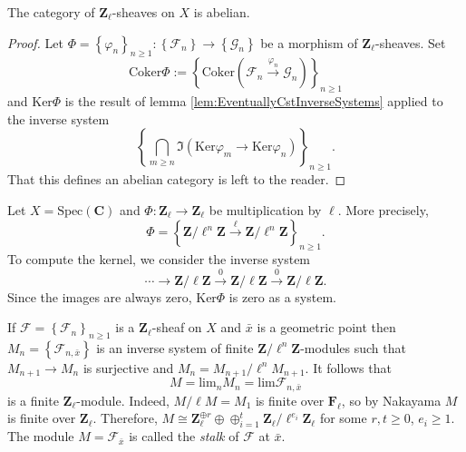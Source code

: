 \begin{lemma}
The category of $\mathbf{Z}_\ell$-sheaves on $X$ is abelian.
\end{lemma}

\begin{proof}
Let $\Phi=\left\{\varphi_n\right\}_{n\geq 1}: \left\{\mathcal{F}_n\right\}\to
\left\{\mathcal{G}_n\right\}$ be a morphism of $\mathbf{Z}_\ell$-sheaves. Set
$$
\text{Coker} \Phi := \left\{
\text{Coker}\left(\mathcal{F}_n\xrightarrow{\varphi_n}
\mathcal{G}_n\right)\right\}_{n\geq 1}
$$
and $\text{Ker}\Phi$ is the result of lemma
\ref{lem:EventuallyCstInverseSystems} applied to the inverse system
$$
\left\{\bigcap_{m\geq n} \Im \left( \text{Ker} \varphi_m \to \text{Ker}
\varphi_n \right)\right\}_{n\geq 1}.
$$
That this defines an abelian category is left to the reader.
\end{proof}

\begin{example}
Let $X=\text{Spec}(\mathbf{C})$ and $\Phi : \mathbf{Z}_\ell\to \mathbf{Z}_\ell$
be multiplication by $\ell$. More precisely,
$$
\Phi = \left\{ \mathbf{Z}/\ell^n\mathbf{Z} \xrightarrow{\ell}
\mathbf{Z}/\ell^n\mathbf{Z}\right\}_{n \geq 1}.
$$
To compute the kernel, we consider the inverse system
$$
\cdots\to \mathbf{Z}/\ell\mathbf{Z}\xrightarrow{0}
\mathbf{Z}/\ell\mathbf{Z}\xrightarrow{0}\mathbf{Z}/\ell\mathbf{Z}.
$$
Since the images are always zero, $\text{Ker} \Phi$ is zero as a system.
\end{example}

\begin{remark}
If $\mathcal{F} = \left\{\mathcal{F}_n\right\}_{n\geq 1}$ is a
$\mathbf{Z}_\ell$-sheaf on $X$ and $\bar x$ is a geometric point then
$M_n=\left\{\mathcal{F}_{n, \bar x}\right\}$ is an inverse system of finite
$\mathbf{Z}/\ell^n\mathbf{Z}$-modules such that $M_{n+1}\to M_n$ is surjective
and $M_n=M_{n+1}/\ell^n M_{n+1}$. It follows that
$$
M= \text{lim}_n M_n = \text{lim} \mathcal{F}_{n, \bar x}
$$
is a finite $\mathbf{Z}_\ell$-module. Indeed, $M/\ell M= M_1$ is finite over
$\mathbf{F}_\ell$, so by Nakayama $M$ is finite over $\mathbf{Z}_\ell$.
Therefore, $M\cong \mathbf{Z}_\ell^{\oplus r} \oplus \oplus_{i=1}^t
\mathbf{Z}_\ell/\ell^{e_i}\mathbf{Z}_\ell$ for some $r, t\geq 0$, $e_i\geq 1$.
The module $M = \mathcal{F}_{\bar x}$ is called the {\it stalk} of
$\mathcal{F}$ at $\bar x$.
\end{remark}

